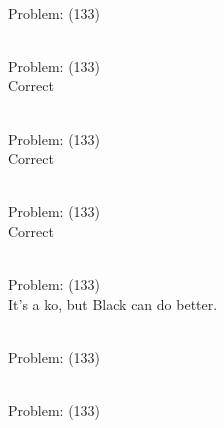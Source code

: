\documentclass[11pt]{article}
\begin{document}
\begin{minipage}[t]{0.5\textwidth}
  {\centering
  
\\
Problem: (133)\\
  }
\end{minipage}
\begin{minipage}[t]{0.5\textwidth}
  {\centering
  
\\
Problem: (133)\\
Correct\\
  }
\end{minipage}
\begin{minipage}[t]{0.5\textwidth}
  {\centering
  
\\
Problem: (133)\\
Correct\\
  }
\end{minipage}
\begin{minipage}[t]{0.5\textwidth}
  {\centering
  
\\
Problem: (133)\\
Correct\\
  }
\end{minipage}
\begin{minipage}[t]{0.5\textwidth}
  {\centering
  
\\
Problem: (133)\\
It's a ko, but Black can do better.\\
  }
\end{minipage}
\begin{minipage}[t]{0.5\textwidth}
  {\centering
  
\\
Problem: (133)\\
  }
\end{minipage}
\begin{minipage}[t]{0.5\textwidth}
  {\centering
  
\\
Problem: (133)\\
  }
\end{minipage}
\end{document}
